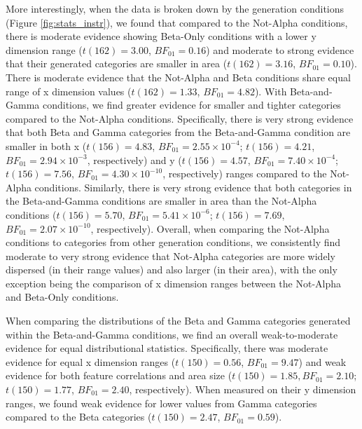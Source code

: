\documentclass[10pt,letterpaper]{article}
\begin{document}
More interestingly, when the data is broken down by the generation conditions (Figure \ref{fig:stats_instr}), we found that compared to the Not-Alpha conditions, there is moderate evidence showing Beta-Only conditions with a lower y dimension range ($t(162) = 3.00$, $BF_{01} = 0.16$) and moderate to strong evidence that their generated categories are smaller in area ($t(162) = 3.16$, $BF_{01} = 0.10$). There is moderate evidence that the Not-Alpha and Beta conditions share equal range of x dimension values ($t(162) = 1.33$, $BF_{01} = 4.82$). With Beta-and-Gamma conditions, we find greater evidence for smaller and tighter categories compared to the Not-Alpha conditions. Specifically, there is very strong evidence that both Beta and Gamma categories from the Beta-and-Gamma condition are smaller in both x ($t(156) = 4.83$, $BF_{01} = 2.55 \times 10^{-4}$; $t(156) = 4.21$, $BF_{01} = 2.94 \times 10^{-3}$, respectively) and y ($t(156) = 4.57$, $BF_{01} = 7.40 \times 10^{-4}$; $t(156) = 7.56$, $BF_{01} = 4.30 \times 10^{-10}$, respectively) ranges compared to the Not-Alpha conditions. Similarly, there is very strong evidence that both categories in the Beta-and-Gamma conditions are smaller in area than the Not-Alpha conditions ($t(156) = 5.70$, $BF_{01} = 5.41 \times 10^{-6}$; $t(156) = 7.69$, $BF_{01} = 2.07 \times 10^{-10}$, respectively). Overall, when comparing the Not-Alpha conditions to categories from other generation conditions, we consistently find moderate to very strong evidence that Not-Alpha categories are more widely dispersed (in their range values) and also larger (in their area), with the only exception being the comparison of x dimension ranges between the Not-Alpha and Beta-Only conditions.

When comparing the distributions of the Beta and Gamma categories generated within the Beta-and-Gamma conditions, we find an overall weak-to-moderate evidence for equal distributional statistics. Specifically, there was moderate evidence for equal x dimension ranges ($t(150) = 0.56$, $BF_{01} = 9.47$) and weak evidence for both feature correlations and area size ($t(150) = 1.85, BF_{01} = 2.10$; $t(150) = 1.77$, $BF_{01} = 2.40$, respectively). When measured on their y dimension ranges, we found weak evidence for lower values from Gamma categories compared to the Beta categories ($t(150) = 2.47$, $BF_{01} = 0.59$).
\end{document}
